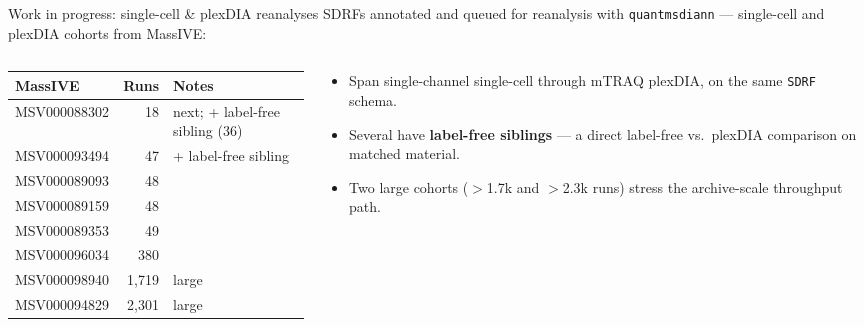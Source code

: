 \documentclass[aspectratio=169,11pt]{beamer}
\newcommand{\quantmsdiann}{\textcolor{qmblue}{\texttt{quantmsdiann}}}
\newcommand{\sdrf}{\texttt{SDRF}}
\begin{document}
\begin{frame}{Work in progress: single-cell \& plexDIA reanalyses}
  SDRFs annotated and queued for reanalysis with \quantmsdiann{} ---
  single-cell and plexDIA cohorts from MassIVE:
  \vspace{0.4em}
  \begin{columns}[T]
    \begin{column}{0.52\textwidth}
      \centering\small
      \begin{tabular}{l r l}
        \toprule
        \textbf{MassIVE} & \textbf{Runs} & \textbf{Notes} \\
        \midrule
        MSV000088302 & 18   & \textcolor{qmblue}{next}; + label-free sibling (36) \\
        MSV000093494 & 47   & + label-free sibling \\
        MSV000089093 & 48   & \\
        MSV000089159 & 48   & \\
        MSV000089353 & 49   & \\
        MSV000096034 & 380  & \\
        MSV000098940 & 1{,}719 & large \\
        MSV000094829 & 2{,}301 & large \\
        \bottomrule
      \end{tabular}
    \end{column}
    \begin{column}{0.46\textwidth}
      \small
      \begin{itemize}
        \item Span single-channel single-cell through mTRAQ plexDIA, on the
              same \sdrf{} schema.
        \item Several have \textbf{label-free siblings} --- a direct
              label-free vs.\ plexDIA comparison on matched material.
        \item Two large cohorts ($>$1.7k and $>$2.3k runs) stress the
              archive-scale throughput path.
      \end{itemize}
    \end{column}
  \end{columns}
\end{frame}
\end{document}
